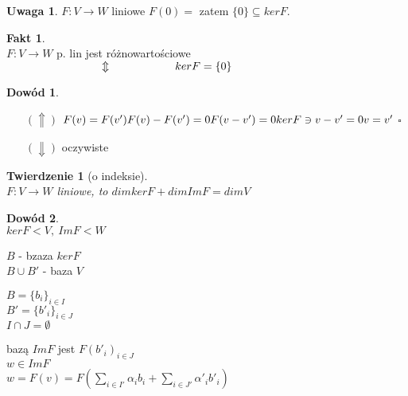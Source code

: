 \documentclass[12pt,a4paper]{article}
\renewcommand{\qed}{$\square$}
\theoremstyle{plain}
\newtheorem{tw}{Twierdzenie}[section]
\theoremstyle{definition}
\newtheorem{ft}{Fakt}[section]
\theoremstyle{definition}
\theoremstyle{definition}
\theoremstyle{definition}
\newtheorem*{dd}{Dowód}
\theoremstyle{definition}
\theoremstyle{definition}
\theoremstyle{definition}
\theoremstyle{definition}
\newtheorem*{uw}{Uwaga}
\theoremstyle{definition}
\begin{document}
\begin{uw}
    $F: V \rightarrow W $ liniowe
    $F(0) = $ %
    zatem $\{0\} \subseteq ker F$.
\end{uw}

\begin{ft} 
    ~\\
    $F: V \rightarrow W $ p. lin jest różnowartościowe \\
    $ \hspace*{30mm} \Updownarrow \\
        \hspace*{20mm} ker F = \{ 0 \}
    $
\end{ft}

\begin{dd} \hfill
    \begin{itemize}
        \item[$(\Uparrow)$] $F(v) = F(v') \\ 
            F(v)-F(v') = 0 \\
            F(v-v') = 0 \\
            ker F \ni v-v' = 0 \\
            v = v' 
        $ \qed
        \item[$(\Downarrow)$] oczywiste
    \end{itemize}
\end{dd}

\begin{tw}[o indeksie]
    ~\\
    $F: V \rightarrow W $ liniowe, to $dimker F + dimIm F = dim V$
\end{tw}
\newpage
\begin{dd}
    ~\\
    $ker F < V,\  Im F < W$ \\
    \begin{minipage}[c]{0.5\textwidth}
        $B$ - bzaza $ker F$ \\
        $ B \cup B' $ - baza $V$
    \end{minipage}%
    \begin{minipage}[c]{0.5\textwidth}
        $B = \{b_i\}_{i \in I}$ \\
        $B' = \{b'_i\}_{i \in J}$ \\
        $I \cap J = \emptyset $
    \end{minipage}
    bazą $Im F$ jest $F(b'_i)_{i \in J}$ \\
    $w \in Im F$ \\
    $w = F(v) = F(\sum\limits_{i \in I'} \alpha_i b_i + \sum\limits_{i \in J'} \alpha'_i b'_i)$ %
\end{dd} 
\end{document}
